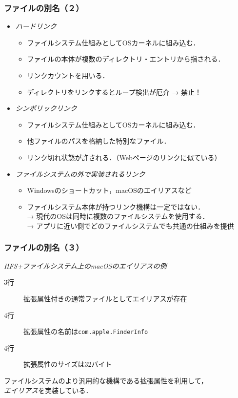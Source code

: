 \documentclass[unicode]{beamer}                   %
\begin{document}
\begin{frame}
  \frametitle{ファイルの別名（２）}
  \begin{itemize}
  \item \emph{ハードリンク} \\
    \begin{itemize}
    \item ファイルシステム仕組みとしてOSカーネルに組み込む．
    \item ファイルの本体が複数のディレクトリ・エントリから指される．
    \item リンクカウントを用いる．
    \item ディレクトリをリンクするとループ検出が厄介 → 禁止！
    \end{itemize}
  \item \emph{シンボリックリンク} \\
    \begin{itemize}
    \item ファイルシステム仕組みとしてOSカーネルに組み込む．
    \item 他ファイルのパスを格納した特別なファイル．
    \item リンク切れ状態が許される．（Webページのリンクに似ている）
    \end{itemize}
  \item \emph{ファイルシステムの外で実装されるリンク} \\
    \begin{itemize}
    \item Windowsのショートカット，macOSのエイリアスなど
    \item ファイルシステム本体が持つリンク機構は一定ではない． \\
      → 現代のOSは同時に複数のファイルシステムを使用する．\\
      → アプリに近い側でどのファイルシステムでも共通の仕組みを提供
    \end{itemize}
  \end{itemize}
\end{frame}

\begin{frame}
  \frametitle{ファイルの別名（３）}
  \emph{HFS+ファイルシステム上のmacOSのエイリアスの例}
  \begin{description}
    \item[3行] 拡張属性付きの通常ファイルとしてエイリアスが存在
    \item[4行] 拡張属性の名前は\texttt{com.apple.FinderInfo}
    \item[4行] 拡張属性のサイズは32バイト
  \end{description}
  ファイルシステムのより汎用的な機構である拡張属性を利用して，\\
  \emph{エイリアス}を実装している．
  \vfill
\end{frame}
\end{document}

